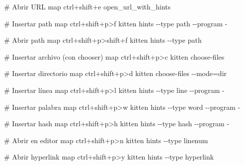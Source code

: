 \documentclass[
  doc,
  floatsintext,
  longtable,
  a4paper,
  nolmodern,
  notxfonts,
  notimes,
  12pt,
  colorlinks=true,linkcolor=blue,citecolor=blue,urlcolor=blue]{apa7}
\newenvironment{Shaded}{\begin{snugshade}}{\end{snugshade}}
\newcommand{\CommentTok}[1]{\textcolor[rgb]{0.37,0.37,0.37}{#1}}
\newcommand{\DataTypeTok}[1]{\textcolor[rgb]{0.68,0.00,0.00}{#1}}
\newcommand{\ErrorTok}[1]{\textcolor[rgb]{0.68,0.00,0.00}{#1}}
\newcommand{\OperatorTok}[1]{\textcolor[rgb]{0.37,0.37,0.37}{#1}}
\begin{document}
\begin{Shaded}
\begin{Highlighting}[]
\CommentTok{\# Abrir URL}
\DataTypeTok{map} \DataTypeTok{ctrl}\ErrorTok{+}\DataTypeTok{shift}\ErrorTok{+}\DataTypeTok{e} \DataTypeTok{open\_url\_with\_hints}

\CommentTok{\# Insertar path}
\DataTypeTok{map} \DataTypeTok{ctrl}\ErrorTok{+}\DataTypeTok{shift}\ErrorTok{+}\DataTypeTok{p}\ErrorTok{\textgreater{}}\DataTypeTok{f} \DataTypeTok{kitten} \DataTypeTok{hints} \DataTypeTok{{-}{-}type} \DataTypeTok{path} \DataTypeTok{{-}{-}program} \DataTypeTok{{-}}

\CommentTok{\# Abrir path}
\DataTypeTok{map} \DataTypeTok{ctrl}\ErrorTok{+}\DataTypeTok{shift}\ErrorTok{+}\DataTypeTok{p}\ErrorTok{\textgreater{}}\DataTypeTok{shift}\ErrorTok{+}\DataTypeTok{f} \DataTypeTok{kitten} \DataTypeTok{hints} \DataTypeTok{{-}{-}type} \DataTypeTok{path}

\CommentTok{\# Insertar archivo (con chooser)}
\DataTypeTok{map} \DataTypeTok{ctrl}\ErrorTok{+}\DataTypeTok{shift}\ErrorTok{+}\DataTypeTok{p}\ErrorTok{\textgreater{}}\DataTypeTok{c} \DataTypeTok{kitten} \DataTypeTok{choose{-}files}

\CommentTok{\# Insertar directorio}
\DataTypeTok{map} \DataTypeTok{ctrl}\ErrorTok{+}\DataTypeTok{shift}\ErrorTok{+}\DataTypeTok{p}\ErrorTok{\textgreater{}}\DataTypeTok{d} \DataTypeTok{kitten} \DataTypeTok{choose{-}files} \DataTypeTok{{-}{-}mode}\OperatorTok{=}\DataTypeTok{dir}

\CommentTok{\# Insertar línea}
\DataTypeTok{map} \DataTypeTok{ctrl}\ErrorTok{+}\DataTypeTok{shift}\ErrorTok{+}\DataTypeTok{p}\ErrorTok{\textgreater{}}\DataTypeTok{l} \DataTypeTok{kitten} \DataTypeTok{hints} \DataTypeTok{{-}{-}type} \DataTypeTok{line} \DataTypeTok{{-}{-}program} \DataTypeTok{{-}}

\CommentTok{\# Insertar palabra}
\DataTypeTok{map} \DataTypeTok{ctrl}\ErrorTok{+}\DataTypeTok{shift}\ErrorTok{+}\DataTypeTok{p}\ErrorTok{\textgreater{}}\DataTypeTok{w} \DataTypeTok{kitten} \DataTypeTok{hints} \DataTypeTok{{-}{-}type} \DataTypeTok{word} \DataTypeTok{{-}{-}program} \DataTypeTok{{-}}

\CommentTok{\# Insertar hash}
\DataTypeTok{map} \DataTypeTok{ctrl}\ErrorTok{+}\DataTypeTok{shift}\ErrorTok{+}\DataTypeTok{p}\ErrorTok{\textgreater{}}\DataTypeTok{h} \DataTypeTok{kitten} \DataTypeTok{hints} \DataTypeTok{{-}{-}type} \DataTypeTok{hash} \DataTypeTok{{-}{-}program} \DataTypeTok{{-}}

\CommentTok{\# Abrir en editor}
\DataTypeTok{map} \DataTypeTok{ctrl}\ErrorTok{+}\DataTypeTok{shift}\ErrorTok{+}\DataTypeTok{p}\ErrorTok{\textgreater{}}\DataTypeTok{n} \DataTypeTok{kitten} \DataTypeTok{hints} \DataTypeTok{{-}{-}type} \DataTypeTok{linenum}

\CommentTok{\# Abrir hyperlink}
\DataTypeTok{map} \DataTypeTok{ctrl}\ErrorTok{+}\DataTypeTok{shift}\ErrorTok{+}\DataTypeTok{p}\ErrorTok{\textgreater{}}\DataTypeTok{y} \DataTypeTok{kitten} \DataTypeTok{hints} \DataTypeTok{{-}{-}type} \DataTypeTok{hyperlink}
\end{Highlighting}
\end{Shaded}
\end{document}
